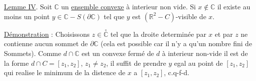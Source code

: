 \uline{Lemme IV}. Soit $\mathbb{C}$ un \uline{ensemble convexe} à interieur non vide. Si $x\notin\mathbb{C}$ il existe au moins un point $y\in\mathbb{C}-S(\partial\mathbb{C})$ tel que $y$ est $(\mathbb{R}^{2}-C)$-visible de $x$.

\uline{Démonstration} : Choisissons $z\in\overset{\circ}{\mathbb{C}}$ tel que la droite determinée par $x$ et par $z$  ne contienne aucun sommet de $\partial\mathbb{C}$ (cela est possible car il n'y a qu'un nombre fini de Sommets). Comme $d\cap\mathbb{C}$ est un convexe fermé de $d$ à interieur  non-vide il est de la forme $d\cap C=[z_{1},z_{2}]$, $z_{1}\ne z_{2}$, il suffit de prendre $y$  egal au point de $[z_{1},z_{2}]$ qui realise le minimum de la distence de $x$ a $[z_{1},z_{2}]$, c.q-f-d.
\margin{!}
